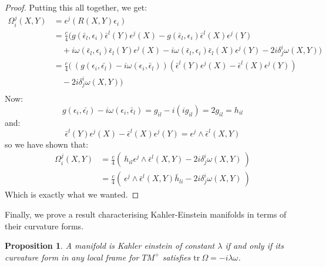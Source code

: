 \documentclass[11pt]{amsart}
\newtheorem{prop}[subsection]{Proposition}
\theoremstyle{definition}
\def \tr{ \text{tr} }
\begin{document}
\begin{proof}
Putting this all together, we get:
%
\begin{align*}
\Omega^j_i (X,Y) &= \epsilon^j ( R(X,Y) \epsilon_i ) \\
%
&= \frac{c}{4} (g( \bar{ \epsilon }_l, \epsilon_i ) \bar{ \epsilon }^l (Y) \epsilon^j(X) - g( \bar{\epsilon}_l, \epsilon_i ) \bar{ \epsilon }^l (X) \epsilon^j (Y) \\
& \quad + i \omega( \bar{ \epsilon }_l, \epsilon_i ) \bar{ \epsilon }_l (Y) \epsilon^j (X) - i \omega( \bar{ \epsilon }_l, \epsilon_i ) \bar{ \epsilon }_l (X) \epsilon^j (Y) - 2 i \delta^i_j \omega( X, Y )) \\
%
&= \frac{c}{4}( \ ( g( \epsilon_i, \bar{ \epsilon_l } ) - i \omega( \epsilon_i, \bar{ \epsilon }_l ) )( \bar{ \epsilon }^l (Y) \epsilon^j (X) - \bar{ \epsilon }^l (X) \epsilon^j (Y)) \\
& \quad - 2 i \delta^i_j \omega( X, Y )) \\
\end{align*}
%
Now:
%
$$ g( \epsilon_i, \bar{ \epsilon_l } ) - i \omega( \epsilon_i, \bar{ \epsilon }_l ) = g_{il} - i( i g_{il} ) = 2 g_{il} = h_{il} $$
%
and:
%
$$ \bar{ \epsilon }^l (Y) \epsilon^j (X) - \bar{ \epsilon }^l (X) \epsilon^j (Y) = \epsilon^j \wedge \bar{ \epsilon }^l (X,Y) $$
%
so we have shown that:
%
\begin{align*}
\Omega^j_i (X,Y) &= \frac{c}{4} ( \ h_{il} \epsilon^j \wedge \bar{ \epsilon }^l (X,Y) - 2 i \delta^i_j \omega( X, Y ) \ ) \\
&= \frac{c}{4} ( \ \epsilon^j \wedge \bar{ \epsilon }^l (X,Y) \bar{h}_{li} - 2 i \delta^i_j \omega( X, Y ) \ )
\end{align*}
%
Which is exactly what we wanted.
%
\end{proof}

Finally, we prove a result characterising Kahler-Einstein manifolds in terms of their curvature forms.

\begin{prop}
A manifold is Kahler einstein of constant $\lambda$ if and only if its curvature form in any local frame for $TM^{+}$ satisfies $ \tr \ \Omega =  - i \lambda \omega $.
\end{prop}
\end{document}
